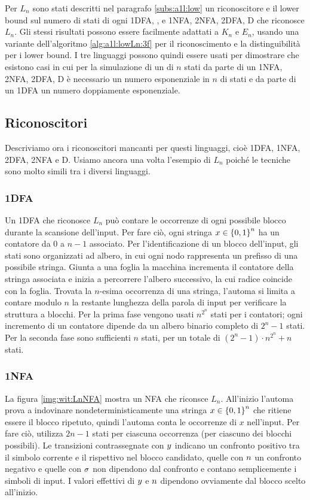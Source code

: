 Per $L_n$ sono stati descritti nel paragrafo \ref{subs:a1l:low} un  riconoscitore e il lower bound sul numero di stati di ogni 1DFA, , e 1NFA, 2NFA, 2DFA, D che riconosce $L_n$. Gli stessi risultati possono essere facilmente adattati a $K_n$ e $E_n$, usando una variante dell'algoritmo \ref{alg:a1l:lowLn:3f} per il riconoscimento e la distinguibilità per i lower bound.
I tre linguaggi possono quindi essere usati per dimostrare che esistono casi in cui per la simulazione di un  di $n$ stati da parte di un 1NFA, 2NFA, 2DFA, D è necessario un numero esponenziale in $n$ di stati e da parte di un 1DFA un numero doppiamente esponenziale.


\subsection{Riconoscitori}
Descriviamo ora i riconoscitori mancanti per questi linguaggi, cioè 1DFA, 1NFA, 2DFA, 2NFA e D. Usiamo ancora una volta l'esempio di $L_n$ poiché le tecniche sono molto simili tra i diversi linguaggi.

\subsubsection{1DFA}
Un 1DFA che riconosce $L_n$ può contare le occorrenze di ogni possibile blocco durante la scansione dell'input. Per fare ciò, ogni stringa $x\in\left\{ 0,1 \right\}^n$ ha un contatore da $0$ a $n-1$ associato. Per l'identificazione di un blocco dell'input, gli stati sono organizzati ad albero, in cui ogni nodo rappresenta un prefisso di una possibile stringa. Giunta a una foglia la macchina incrementa il contatore della stringa associata e inizia a percorrere l'albero successivo, la cui radice coincide con la foglia. Trovata la $n$-esima occorrenza di una stringa, l'automa si limita a contare modulo $n$ la restante lunghezza della parola di input per verificare la struttura a blocchi. Per la prima fase vengono usati $n^{2^n}$ stati per i contatori; ogni incremento di un contatore dipende da un albero binario completo di $2^n-1$ stati. Per la seconda fase sono sufficienti $n$ stati, per un totale di $(2^n-1)\cdot n^{2^n}+n$ stati.

\subsubsection{1NFA}
La figura \ref{img:wit:LnNFA} mostra un NFA che riconsce $L_n$. All'inizio l'automa prova a indovinare nondeterministicamente una stringa $x\in\left\{ 0,1 \right\}^n$ che ritiene essere il blocco ripetuto, quindi l'automa conta le occorrenze di $x$ nell'input. Per fare ciò, utilizza $2n-1$ stati per ciascuna occorrenza (per ciascuno dei blocchi possibili). Le transizioni contrassegnate con $y$ indicano un confronto positivo tra il simbolo corrente e il rispettivo nel blocco candidato, quelle con $n$ un confronto negativo e quelle con $\sigma$ non dipendono dal confronto e contano semplicemente i simboli di input. I valori effettivi di $y$ e $n$ dipendono ovviamente dal blocco scelto all'inizio.

